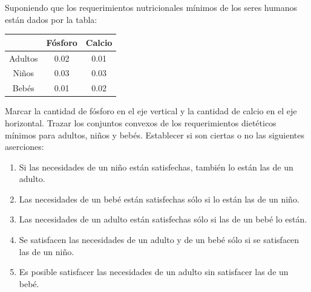 \begin{Ejer}
Suponiendo que los requerimientos nutricionales m\'inimos de los seres humanos est\'an dados por la tabla:

\begin{center}
\begin{tabular}{c|cc}
 & F\'osforo & Calcio \\
\hline
Adultos & 0.02 & 0.01 \\
Ni\~nos & 0.03 & 0.03 \\
Beb\'es & 0.01 & 0.02 \\
\end{tabular}
\end{center}

Marcar la cantidad de f\'osforo en el eje vertical y la cantidad de calcio en el eje horizontal. Trazar los conjuntos convexos de los requerimientos diet\'eticos m\'inimos para adultos, ni\~nos y beb\'es. Establecer si son ciertas o no las siguientes aserciones:

\begin{enumerate}
\item Si las necesidades de un ni\~no est\'an satisfechas, tambi\'en lo est\'an las de un adulto.
\item Las necesidades de un beb\'e est\'an satisfechas s\'olo si lo est\'an las de un ni\~no.
\item Las necesidades de un adulto est\'an satisfechas s\'olo si las de un beb\'e lo est\'an.
\item Se satisfacen las necesidades de un adulto y de un beb\'e s\'olo si se satisfacen las de un ni\~no.
\item Es posible satisfacer las necesidades de un adulto sin satisfacer las de un beb\'e.
\end{enumerate}
\end{Ejer}

